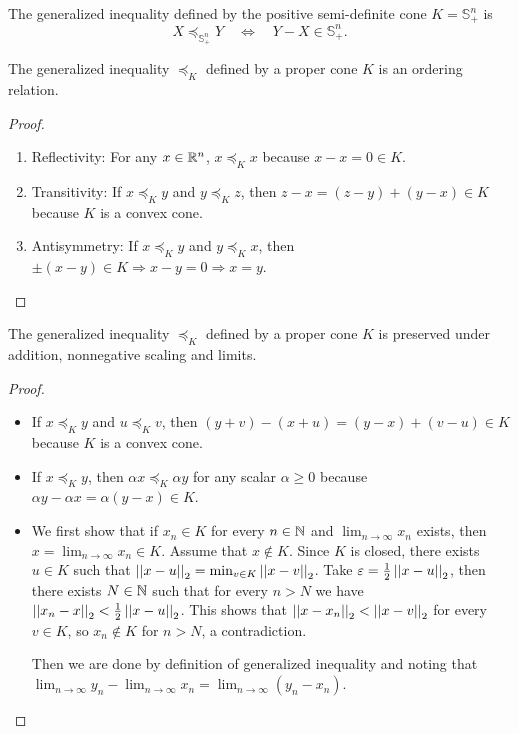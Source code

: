 \documentclass[12pt]{article}
\begin{document}
\begin{example}
    The generalized inequality defined by the positive semi-definite cone \(K=\mathbb S_+^n\) is
    \[X\preceq_{\mathbb S_+^n}Y\quad\iff\quad Y-X\in\mathbb S_+^n.\]
\end{example}

\begin{proposition}
    The generalized inequality \(\preceq_K\) defined by a proper cone \(K\) is an ordering relation.
\end{proposition}
\begin{proof}
    \begin{enumerate}
        \item Reflectivity: For any \(x\in\mathbb R^n\), \(x\preceq_K x\) because \(x-x=0\in K\).
        \item Transitivity: If \(x\preceq_K y\) and \(y\preceq_K z\), then \(z-x=(z-y)+(y-x)\in K\) because \(K\) is a convex cone.
        \item Antisymmetry: If \(x\preceq_K y\) and \(y\preceq_K x\), then \(\pm(x-y)\in K\Rightarrow x-y=0\Rightarrow x=y\).
    \end{enumerate}
\end{proof}

\begin{proposition}
    The generalized inequality \(\preceq_K\) defined by a proper cone \(K\) is preserved under addition, nonnegative scaling and limits.
\end{proposition}
\begin{proof}
    \begin{itemize}
        \item If \(x\preceq_K y\) and \(u\preceq_K v\), then \((y+v)-(x+u)=(y-x)+(v-u)\in K\) because \(K\) is a convex cone.
        \item If \(x\preceq_K y\), then \(\alpha x\preceq_K\alpha y\) for any scalar \(\alpha\geqslant 0\) because \(\alpha y-\alpha x=\alpha(y-x)\in K\).
        \item We first show that if \(x_n\in K\) for every \(n\in\mathbb N\) and \(\lim_{n\to\infty}x_n\) exists, then \(x=\lim_{n\to\infty}x_n\in K\). Assume that \(x\notin K\). Since \(K\) is closed, there exists \(u\in K\) such that \(\left|\left|x-u\right|\right|_2=\min_{v\in K}\left|\left|x-v\right|\right|_2\). Take \(\varepsilon=\frac12\left|\left|x-u\right|\right|_2\), then there exists \(N\in\mathbb N\) such that for every \(n>N\) we have \(\left|\left|x_n-x\right|\right|_2<\frac12\left|\left|x-u\right|\right|_2\). This shows that \(\left|\left|x-x_n\right|\right|_2<\left|\left|x-v\right|\right|_2\) for every \(v\in K\), so \(x_n\notin K\) for \(n>N\), a contradiction.\par
        Then we are done by definition of generalized inequality and noting that \(\lim_{n\to\infty}y_n-\lim_{n\to\infty}x_n=\lim_{n\to\infty}(y_n-x_n)\).
    \end{itemize}
\end{proof}
\end{document}
